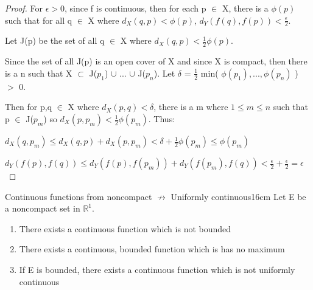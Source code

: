     \begin{proof}
        For $\epsilon > 0$, since f is continuous, then for each
        p $\in$ X, there is a $\phi(p)$ such that for all q $\in$ X
        where $d_X(q,p) < \phi(p)$, $d_Y(f(q),f(p)) < \frac{\epsilon}{2}$.

        Let J(p) be the set of all q $\in$ X where
        $d_X(q,p) < \frac{1}{2}\phi(p)$.

        Since the set of all J(p) is an open cover of X and since X is compact,
        then there is a n such that X $\subset$ J($p_1$) $\cup$ ... $\cup$ J($p_n$).
        Let $\delta$ = $\frac{1}{2}$ min( $\phi(p_1), ... , \phi(p_n)$ ) $>$ 0.

        Then for p,q $\in$ X where $d_X(p,q) < \delta$, there is a m where
        $1 \leq m \leq n$ such that p $\in$ J($p_m$) so
        $d_X(p,p_m) < \frac{1}{2} \phi(p_m)$. Thus:

        \hspace{1cm}
        $d_X(q,p_m) \leq d_X(q,p) + d_X(p,p_m) < \delta + \frac{1}{2} \phi(p_m)
        \leq \phi(p_m)$

        \hspace{1cm}
        $d_Y(f(p),f(q)) \leq d_Y(f(p),f(p_m)) + d_Y(f(p_m),f(q))
        < \frac{\epsilon}{2} + \frac{\epsilon}{2} = \epsilon$
    \end{proof}

    \vspace{0.5cm}



    \begin{wtheorem}{Continuous functions from noncompact
    $\not \rightarrow$ Uniformly continuous}{16cm}
        Let E be a noncompact set in $\mathbb{R}^1$.

        \begin{enumerate}[label=(\alph*), leftmargin=1cm, itemsep=0.1cm]
            \item There exists a continuous function which is not bounded
            
            \item There exists a continuous, bounded function which is
            has no maximum
            
            \item If E is bounded, there exists a continuous function which
            is not uniformly continuous
        \end{enumerate}
    \end{wtheorem}
    
